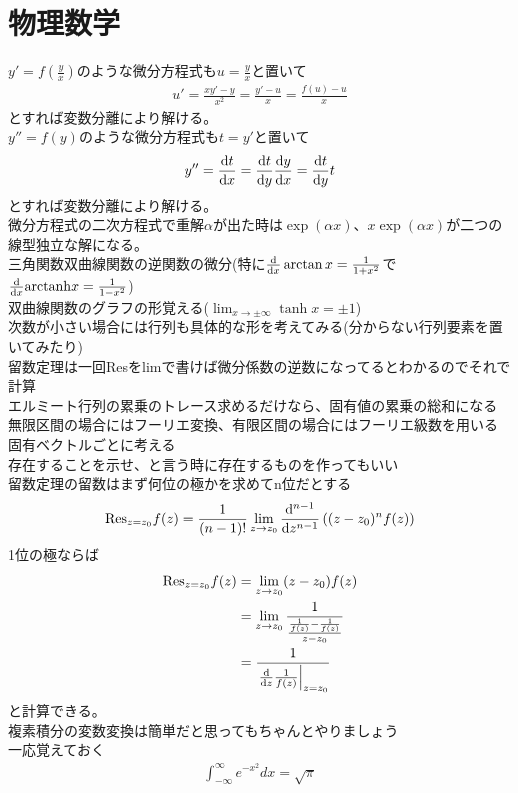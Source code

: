 \documentclass{ltjsarticle}
\begin{document}
  \section{物理数学}
  $y'=f\left( \frac{y}{x} \right) $のような微分方程式も$u=\frac{y}{x}$と置いて
  \begin{align}
    u'=\frac{xy'-y}{x^2}=\frac{y'-u}{x}=\frac{f(u)-u}{x}
  \end{align}
  とすれば変数分離により解ける。\\
  $y''=f(y)$のような微分方程式も$t=y'$と置いて
  \begin{align}
    y''=\dv{t}{x}=\dv{t}{y}\dv{y}{x}=\dv{t}{y}t
  \end{align}
  とすれば変数分離により解ける。\\
  微分方程式の二次方程式で重解$\alpha$が出た時は$\exp\left( \alpha x \right) $、$x \exp\left( \alpha x \right) $が二つの線型独立な解になる。\\
  三角関数双曲線関数の逆関数の微分(特に$\dv{x}\arctan{x}=\frac{1}{1+x^2}$で$\dv{x}\mathrm{arctanh}{x}=\frac{1}{1-x^2}$)\\
  双曲線関数のグラフの形覚える($\lim_{x\to\pm\infty}\tanh{x}=\pm 1$)\\
  次数が小さい場合には行列も具体的な形を考えてみる(分からない行列要素を置いてみたり)\\
  留数定理は一回Resをlimで書けば微分係数の逆数になってるとわかるのでそれで計算\\
  エルミート行列の累乗のトレース求めるだけなら、固有値の累乗の総和になる\\
  無限区間の場合にはフーリエ変換、有限区間の場合にはフーリエ級数を用いる\\
  固有ベクトルごとに考える\\
  存在することを示せ、と言う時に存在するものを作ってもいい\\
  留数定理の留数はまず何位の極かを求めてn位だとする
  \begin{align}
    \mathrm{Res}_{z=z_0}f(z)=\frac{1}{(n-1)!}\lim_{z\to z_0}\dv[n-1]{z}\left((z-z_0)^nf(z)\right)
  \end{align}
  1位の極ならば
  \begin{align}
    \mathrm{Res}_{z=z_0}f(z)&=\lim_{z\to z_0}(z-z_0)f(z)\\
    &=\lim_{z\to z_0}\frac{1}{\frac{\frac{1}{f(z)}-\frac{1}{f(z)}}{z-z_0}}\\
    &=\frac{1}{\eval{\dv{z}\frac{1}{f(z)}}_{z=z_0}}\\
  \end{align}
  と計算できる。\\
  複素積分の変数変換は簡単だと思ってもちゃんとやりましょう\\
  一応覚えておく
  \begin{align}
    \int_{-\infty}^{\infty}e^{-x^2}dx=\sqrt{\pi}
  \end{align}
\end{document}
